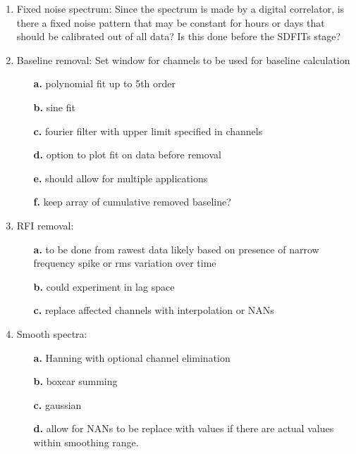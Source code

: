 \documentclass[12pt,a4paper]{article}
\begin{document}
\begin{enumerate}
\item   Fixed noise spectrum:
   Since the spectrum is made by a digital correlator, is there
      a fixed noise pattern that may be constant for hours or days
      that should be calibrated out of all data?
    Is this done before the SDFITs stage?

\item    Baseline removal:
   Set window for channels to be used for baseline calculation
   \begin{itemize}
  \item[{\bf a.}]   
    polynomial fit up to 5th order
  \item[{\bf b.}]   
    sine fit
  \item[{\bf c.}]   
    fourier filter with upper limit specified in channels
  \item[{\bf d.}]   
    option to plot fit on data before removal
  \item[{\bf e.}]   
    should allow for multiple applications
  \item[{\bf f.}]   
   keep array of cumulative removed baseline?
  \end{itemize}

\item RFI removal:
  \begin{itemize}
  \item[{\bf a.}]  
   to be done from rawest data likely based on presence of narrow 
   frequency spike or rms variation over time
  \item[{\bf b.}]  
    could experiment in lag space
  \item[{\bf c.}]      
   replace affected channels with interpolation or NANs
  \end{itemize}

\item Smooth spectra:
  \begin{itemize}
  \item[{\bf a.}]  
    Hanning with optional channel elimination
  \item[{\bf b.}]  
    boxcar summing
  \item[{\bf c.}]
    gaussian
  \item[{\bf d.}]   
   allow for NANs to be replace with values if there
       are actual values within smoothing range.
  \end{itemize}


\end{enumerate}
\end{document}
